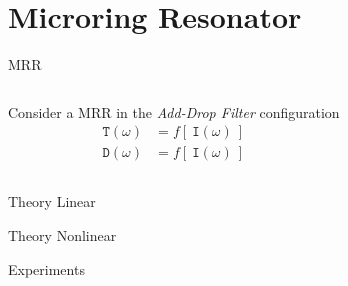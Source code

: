 \documentclass[11pt]{beamer}
\begin{document}
\section{Microring Resonator}
\begin{frame}{MRR}
	\begin{columns}
		Consider a MRR in the \textit{Add-Drop Filter} configuration
		\begin{align*}
			\texttt{T} \left( \omega \right) &= f \left[ ~\texttt{I} \left( \omega \right) ~\right] \\
			\texttt{D} \left( \omega \right) &= f \left[ ~\texttt{I} \left( \omega \right) ~\right]
		\end{align*}
		
		\begin{figure}
			\centering
			
		\end{figure}
	\end{columns}
\end{frame}
\begin{frame}{Theory}
Linear
\end{frame}
\begin{frame}{Theory}
Nonlinear
\end{frame}
\begin{frame}[plain]{Experiments}
	\begin{figure}[htbp]
	
	\end{figure}
\end{frame}

\end{document}
